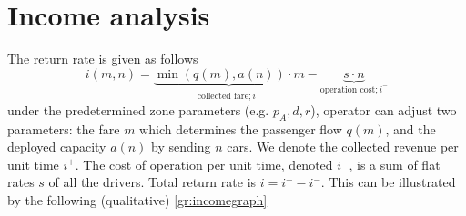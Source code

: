 \documentclass[a4paper]{report}
\begin{document}
\def\pd{p_A^{\dagger}}
\section{Income analysis}
The return rate is given as follows
\begin{equation}
	i(m,n) =\underbrace{\min{} (q(m),a(n)) \cdot m}_{\text{collected fare}; i^+} - \underbrace{s\cdot n}_{\text{operation cost}; i^-} \label{eq:revenuerate}
\end{equation}
under the predetermined zone parameters (e.g. $p_A, d, r$), operator can adjust two parameters: the fare $m$ which determines the passenger flow $q(m)$, and the deployed capacity $a(n)$ by sending $n$ cars. We denote the collected revenue per unit time $i^{+}$. The cost of operation per unit time, denoted $i^{-}$, is a sum of flat rates $s$ of all the drivers. Total return rate is $i=i^{+}-i^{-}$. This can be illustrated by the following (qualitative) \autoref{gr:incomegraph}
\end{document}
